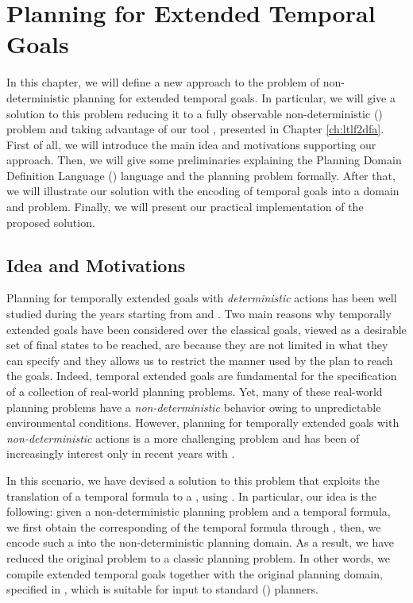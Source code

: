 \chapter{Planning for Extended Temporal Goals}
In this chapter, we will define a new approach to the problem of non-deterministic planning for extended temporal goals. In particular, we will give a solution to this problem reducing it to a fully observable non-deterministic (\FOND) problem and taking advantage of our tool \LTLfToDFA, presented in Chapter \ref{ch:ltlf2dfa}. First of all, we will introduce the main idea and motivations supporting our approach. Then, we will give some preliminaries explaining the Planning Domain Definition Language (\PDDL) language and the \FOND planning problem formally. After that, we will illustrate our solution with the encoding of temporal goals into a \PDDL domain and problem. Finally, we will present our practical implementation of the proposed solution.
\section{Idea and Motivations}
Planning for temporally extended goals with \textit{deterministic} actions has been well studied during the years starting from \citep{bacchus1998planning} and \citep{doherty2001talplanner}. Two main reasons why temporally extended goals have been considered over the classical goals, viewed as a desirable set of final states to be reached, are because they are not limited in what they can specify and they allows us to restrict the manner used by the plan to reach the goals. Indeed, temporal extended goals are fundamental for the specification of a collection of real-world planning problems. Yet, many of these real-world planning problems have a \textit{non-deterministic} behavior owing to unpredictable environmental conditions. However, planning for temporally extended goals with \textit{non-deterministic} actions is a more challenging problem and has been of increasingly interest only in recent years with \citep{camacho2017non}.

In this scenario, we have devised a solution to this problem that exploits the translation of a temporal formula to a \DFA, using \LTLfToDFA. In particular, our idea is the following: given a non-deterministic planning problem and a temporal formula, we first obtain the corresponding \DFA of the temporal formula through \LTLfToDFA, then, we encode such a \DFA into the non-deterministic planning domain. As a result, we have reduced the original problem to a classic \FOND planning problem. In other words, we compile extended temporal goals together with the original planning domain, specified in \PDDL, which is suitable for input to standard (\FOND) planners.
